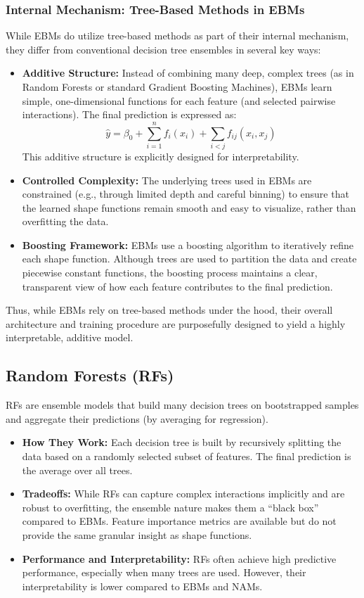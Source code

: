\documentclass{article}
\begin{document}
\subsubsection*{Internal Mechanism: Tree-Based Methods in EBMs}
While EBMs do utilize tree-based methods as part of their internal mechanism, they differ from conventional decision tree ensembles in several key ways:
\begin{itemize}
    \item \textbf{Additive Structure:} Instead of combining many deep, complex trees (as in Random Forests or standard Gradient Boosting Machines), EBMs learn simple, one-dimensional functions for each feature (and selected pairwise interactions). The final prediction is expressed as:
    \[
    \hat{y} = \beta_0 + \sum_{i=1}^{n} f_i(x_i) + \sum_{i<j} f_{ij}(x_i,x_j)
    \]
    This additive structure is explicitly designed for interpretability.
    \item \textbf{Controlled Complexity:} The underlying trees used in EBMs are constrained (e.g., through limited depth and careful binning) to ensure that the learned shape functions remain smooth and easy to visualize, rather than overfitting the data.
    \item \textbf{Boosting Framework:} EBMs use a boosting algorithm to iteratively refine each shape function. Although trees are used to partition the data and create piecewise constant functions, the boosting process maintains a clear, transparent view of how each feature contributes to the final prediction.
\end{itemize}
Thus, while EBMs rely on tree-based methods under the hood, their overall architecture and training procedure are purposefully designed to yield a highly interpretable, additive model.


\subsection*{Random Forests (RFs)}
RFs are ensemble models that build many decision trees on bootstrapped samples and aggregate their predictions (by averaging for regression).  
\begin{itemize}
    \item \textbf{How They Work:} Each decision tree is built by recursively splitting the data based on a randomly selected subset of features. The final prediction is the average over all trees.
    \item \textbf{Tradeoffs:} While RFs can capture complex interactions implicitly and are robust to overfitting, the ensemble nature makes them a “black box” compared to EBMs. Feature importance metrics are available but do not provide the same granular insight as shape functions.
    \item \textbf{Performance and Interpretability:} RFs often achieve high predictive performance, especially when many trees are used. However, their interpretability is lower compared to EBMs and NAMs.
\end{itemize}
\end{document}
